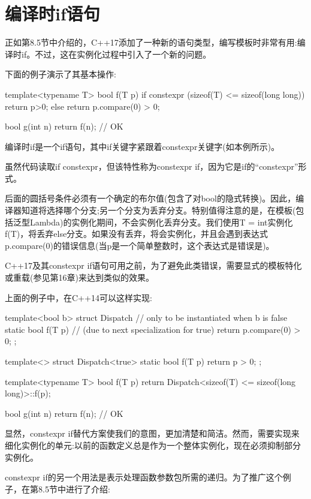 \section{编译时if语句}
正如第8.5节中介绍的，C++17添加了一种新的语句类型，编写模板时非常有用:编译时if。不过，这在实例化过程中引入了一个新的问题。

下面的例子演示了其基本操作:

\begin{cpp}
template<typename T> bool f(T p) {
	if constexpr (sizeof(T) <= sizeof(long long)) {
		return p>0;
	} else {
		return p.compare(0) > 0;
	}
}

bool g(int n) {
	return f(n); // OK
}
\end{cpp}

编译时if是一个if语句，其中if关键字紧跟着constexpr关键字(如本例所示)。

\begin{notice}
虽然代码读取if constexpr，但该特性称为constexpr if，因为它是if的“constexpr”形式。
\end{notice}

后面的圆括号条件必须有一个确定的布尔值(包含了对bool的隐式转换)。因此，编译器知道将选择哪个分支;另一个分支为丢弃分支。特别值得注意的是，在模板(包括泛型Lambda)的实例化期间，不会实例化丢弃分支。我们使用T = int实例化f(T)，将丢弃else分支。如果没有丢弃，将会实例化，并且会遇到表达式p.compare(0)的错误信息(当p是一个简单整数时，这个表达式是错误是)。

C++17及其constexpr if语句可用之前，为了避免此类错误，需要显式的模板特化或重载(参见第16章)来达到类似的效果。

上面的例子中，在C++14可以这样实现:

\begin{cpp}
template<bool b> struct Dispatch { // only to be instantiated when b is false
	static bool f(T p) { // (due to next specialization for true)
		return p.compare(0) > 0;
	}
};

template<> struct Dispatch<true> {
	static bool f(T p) {
		return p > 0;
	}
};

template<typename T> bool f(T p) {
	return Dispatch<sizeof(T) <= sizeof(long long)>::f(p);
}

bool g(int n) {
	return f(n); // OK
}
\end{cpp}

显然，constexpr if替代方案使我们的意图，更加清楚和简洁。然而，需要实现来细化实例化的单元:以前的函数定义总是作为一个整体实例化，现在必须抑制部分实例化。

constexpr if的另一个用法是表示处理函数参数包所需的递归。为了推广这个例子，在第8.5节中进行了介绍:

